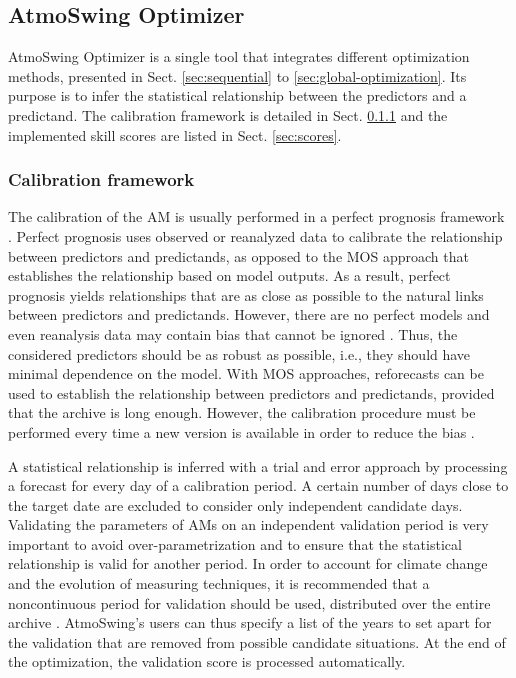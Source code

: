 \documentclass[gmdd]{copernicus}
\begin{document}
\subsection{AtmoSwing Optimizer}
\label{sec:optimizer}

AtmoSwing Optimizer is a single tool that integrates different optimization methods, presented in Sect. \ref{sec:sequential} to \ref{sec:global-optimization}. Its purpose is to infer the statistical relationship between the predictors and a predictand. The calibration framework is detailed in Sect. \ref{sec:calibration-framework} and the implemented skill scores are listed in Sect. \ref{sec:scores}.


\subsubsection{Calibration framework}
\label{sec:calibration-framework}

The calibration of the AM is usually performed in a perfect prognosis \citep{Klein1959} framework \citep{Bontron2004, BenDaoud2010}. Perfect prognosis uses observed or reanalyzed data to calibrate the relationship between predictors and predictands, as opposed to the MOS approach that establishes the relationship based on model outputs. As a result, perfect prognosis yields relationships that are as close as possible to the natural links between predictors and predictands. However, there are no perfect models and even reanalysis data may contain bias that cannot be ignored \citep{Dayon2015, Horton2018b}. Thus, the considered predictors should be as robust as possible, i.e., they should have minimal dependence on the model. With MOS approaches, reforecasts can be used to establish the relationship between predictors and predictands, provided that the archive is long enough. However, the calibration procedure must be performed every time a new version is available in order to reduce the bias \citep{Wilson2002}.

A statistical relationship is inferred with a trial and error approach by processing a forecast for every day of a calibration period. A certain number of days close to the target date are excluded to consider only independent candidate days. Validating the parameters of AMs on an independent validation period is very important to avoid over-parametrization and to ensure that the statistical relationship is valid for another period. In order to account for climate change and the evolution of measuring techniques, it is recommended that a noncontinuous period for validation should be used, distributed over the entire archive \citep{BenDaoud2010, Horton2018b}. AtmoSwing's users can thus specify a list of the years to set apart for the validation that are removed from possible candidate situations. At the end of the optimization, the validation score is processed automatically.
\end{document}
